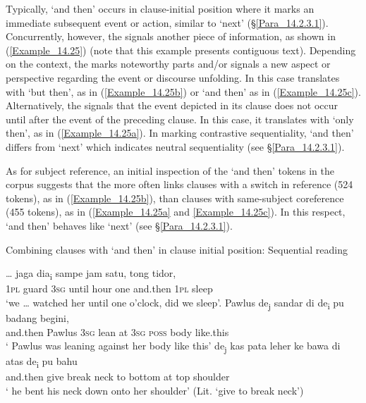 Typically,  ‘and then’ occurs in clause-initial position where it marks an immediate subsequent event or action, similar to   ‘next’ (§\ref{Para_14.2.3.1}). Concurrently, however, the  signals another piece of information, as shown in (\ref{Example_14.25}) (note that this example presents contiguous text). Depending on the context, the  marks noteworthy parts and/or signals a new aspect or perspective regarding the event or discourse unfolding. In this case  translates with ‘but then’, as in (\ref{Example_14.25b}) or ‘and then’ as in (\ref{Example_14.25c}). Alternatively, the  signals that the event depicted in its clause does not occur until after the event of the preceding clause. In this case, it translates with ‘only then’, as in (\ref{Example_14.25a}). In marking contrastive sequentiality,  ‘and then’ differs from  ‘next’ which indicates neutral sequentiality (see §\ref{Para_14.2.3.1}).
%


As for subject reference, an initial inspection of the  ‘and then’ tokens in the corpus suggests that the  more often links clauses with a switch in reference (524 tokens), as in (\ref{Example_14.25b}), than clauses with same-subject coreference (455 tokens), as in (\ref{Example_14.25a} and \ref{Example_14.25c}). In this respect,  ‘and then’ behaves like  ‘next’ (see §\ref{Para_14.2.3.1}).
%

\largerpage
\begin{styleExampleTitle}
Combining clauses with  ‘and then’ in clause initial position: Sequential reading
\end{styleExampleTitle}
\ea
\label{Example_14.25}
\ea
\label{Example_14.25a}

 {\ldots} {jaga} {dia\textsubscript{i}} {sampe} {jam} {satu,} {} {tong} {tidor,}\\ %
   \textsc{1pl}  {}  guard  \textsc{3sg}  until  hour  one  and.then  \textsc{1pl}  sleep\\
 ‘we {\ldots} watched her until one o’clock,  did we sleep’.
\vspace{10pt}
\ex
\label{Example_14.25b}
\gll  {}  Pawlus  de\textsubscript{j}  sandar  di  de\textsubscript{i}  pu  badang  begini,\\
    and.then  Pawlus  \textsc{3sg}  lean  at  \textsc{3sg}  \textsc{poss}  body  like.this\\
  \glt ‘ Pawlus was leaning against her body like this’
  \vspace{10pt}
\ex
\label{Example_14.25c}
\gll {}  de\textsubscript{j}  kas  pata  leher  ke  bawa  di  atas de\textsubscript{i}  pu  bahu\\
    and.then    give  break  neck  to  bottom  at  top       shoulder \\
\glt ‘ he bent his neck down onto her shoulder’ (Lit. ‘give to break neck’) \textstyleExampleSource{[080916-001-CvNP.0005-0006]}
\z
\z

